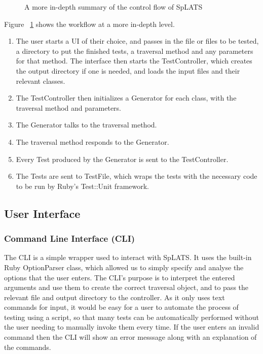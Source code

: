   \begin{center}
  \begin{figure}
  
  \caption{A more in-depth summary of the control flow of SpLATS}
  \label{fig:Architecture_LowLevel}
  \end{figure}
  \end{center}
  Figure ~\ref{fig:Architecture_LowLevel} shows the workflow at a more in-depth level.
  \begin{enumerate}
  \small
  \item The user starts a UI of their choice, and passes in the file or files to be tested, a directory to put the finished tests, a traversal method and any parameters for that method.
    The interface then starts the TestController, which creates the output directory if one is needed, and loads the input files and their relevant classes.
  \item The TestController then initializes a Generator for each class, with the traversal method and parameters.
  \item The Generator talks to the traversal method.
  \item The traversal method responds to the Generator.
  \item Every Test produced by the Generator is sent to the TestController.
  \item The Tests are sent to TestFile, which wraps the tests with the necessary code to be run by Ruby's Test::Unit framework.
  \end{enumerate}
  
  \subsection{User Interface}
  \setcounter{secnumdepth}{4}
  \subsubsection{Command Line Interface (CLI)}
  
  The CLI is a simple wrapper used to interact with SpLATS. 
  It uses the built-in Ruby OptionParser class, which allowed us to simply specify and analyse the options that the user enters. 
  The CLI's purpose is to interpret the entered arguments and use them to create the correct traversal object, and to pass the relevant file and output directory to the controller.
  As it only uses text commands for input, it would be easy for a user to automate the process of testing using a script, so that many tests can be automatically performed without the user needing to manually invoke them every time.
  If the user enters an invalid command then the CLI will show an error messsage along with an explanation of the commands.
  
